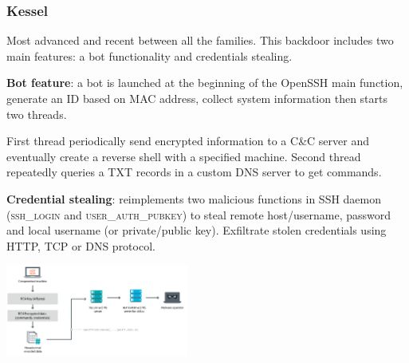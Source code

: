 \begin{frame}
	\frametitle{Kessel}
	
	\small
	
	Most advanced and recent between all the families. This backdoor includes two main features: a bot functionality and credentials stealing.
	
	\medskip
	
	\textbf{Bot feature}: a bot is launched at the beginning of the OpenSSH main function, generate an ID based on MAC address, collect system information then starts two threads.
  
	\smallskip

  First thread periodically send encrypted information to a C\&C server and eventually create a reverse shell with a specified machine. Second thread repeatedly queries a TXT records in a custom DNS server to get commands.    
  
	\medskip
	
	\textbf{Credential stealing}: reimplements two malicious functions in SSH daemon (\textsc{ssh\_login} and \textsc{user\_auth\_pubkey}) to steal remote host/username, password and local username (or private/public key). Exfiltrate stolen credentials using HTTP, TCP or DNS protocol.
  
   \begin{center}    
   \includegraphics[width=0.45\textwidth]{images/dns_exfiltration}
   \end{center}

  	
\end{frame}


